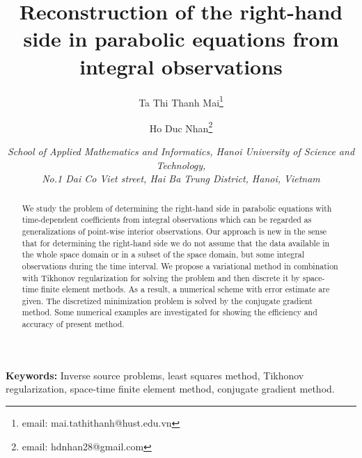 \documentclass[]{article}
\title{Reconstruction of the right-hand side in parabolic equations from integral observations}
\author{Ta Thi Thanh Mai\thanks{email: mai.tathithanh@hust.edu.vn} \and Ho Duc Nhan\thanks{email: hdnhan28@gmail.com}}
\date{\footnotesize\textit{School of Applied Mathematics and Informatics, Hanoi University of Science and Technology, \\ No.1 Dai Co Viet street, Hai Ba Trung District, Hanoi, Vietnam}}
\begin{document}
\justifying
\maketitle
\begin{abstract}
We study the problem of determining the right-hand side in
parabolic equations with time-dependent coefficients from integral observations which can be regarded as generalizations of point-wise interior observations. 
Our approach is new in the sense that for determining the right-hand side we do not assume that the data available in the whole space domain or in a subset of the space domain, but some integral observations during the time interval. 
We propose a variational method in combination with Tikhonov regularization for solving the problem and then discrete it by space-time finite element methods. As a result, a numerical scheme with error estimate are given.
The discretized minimization problem is solved by the conjugate gradient method. Some numerical examples are investigated for showing the efficiency and accuracy
of present method.
\end{abstract}

\textbf{Keywords:} Inverse source problems, least squares method, Tikhonov regularization, space-time finite element method, conjugate gradient method.
\end{document}
